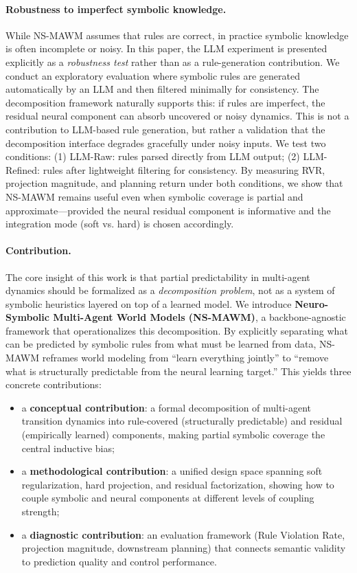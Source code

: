 \documentclass{article}
\theoremstyle{plain}
\theoremstyle{definition}
\theoremstyle{remark}
\begin{document}
\paragraph{Robustness to imperfect symbolic knowledge.}
While NS-MAWM assumes that rules are correct, in practice symbolic knowledge is often incomplete or noisy. In this paper, the LLM experiment is presented explicitly as a
\emph{robustness test} rather than as a rule-generation contribution. We conduct an exploratory evaluation where symbolic rules are generated automatically by an LLM and then filtered minimally for consistency. The decomposition framework naturally supports this: if rules are imperfect, the residual neural component can absorb uncovered or noisy dynamics.
This is not a contribution to LLM-based rule generation, but rather a validation that the decomposition interface degrades gracefully under noisy inputs.
We test two conditions: (1) LLM-Raw: rules parsed directly from LLM output; (2) LLM-Refined: rules after lightweight filtering for consistency. By measuring RVR, projection magnitude, and planning return under both conditions, we show that NS-MAWM remains useful even when symbolic coverage is partial and approximate---provided the neural residual component is informative and the integration mode (soft vs. hard) is chosen accordingly.

\paragraph{Contribution.}
The core insight of this work is that partial predictability in multi-agent dynamics should be formalized as a
\emph{decomposition problem}, not as a system of symbolic heuristics layered on top of a learned model.
We introduce \textbf{Neuro-Symbolic Multi-Agent World Models (NS-MAWM)}, a backbone-agnostic framework that operationalizes this decomposition. By explicitly separating what can be predicted by symbolic rules from what must be learned from data, NS-MAWM reframes world modeling from ``learn everything jointly'' to ``remove what is structurally predictable from the neural learning target.''
This yields three concrete contributions:
\begin{itemize}
  \item a \textbf{conceptual contribution}: a formal decomposition of multi-agent transition dynamics into rule-covered (structurally predictable) and residual (empirically learned) components, making partial symbolic coverage the central inductive bias;
  \item a \textbf{methodological contribution}: a unified design space spanning soft regularization, hard projection, and residual factorization, showing how to couple symbolic and neural components at different levels of coupling strength;
  \item a \textbf{diagnostic contribution}: an evaluation framework (Rule Violation Rate, projection magnitude, downstream planning) that connects semantic validity to prediction quality and control performance.
\end{itemize}
\end{document}
